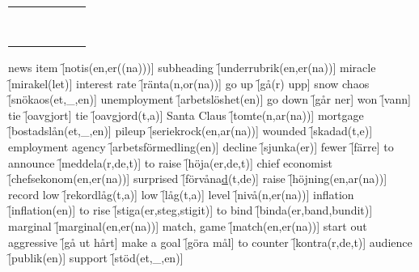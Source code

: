 \begin{center}
\begin{adjustwidth}{-2.45cm}{}
\begin{tabular}{|c c c c c c|}
             &  &  &  &  &  \\
             &  &  &  &  &  \\
             &  &  &  &  &  \\
             &  &  &  &  &  \\
             &  &  &  &  &  \\
             &  &  &  &  &  \\
             &  &  &  &  &  \\
             &  &  &  &  &  \\
            \hline
        \end{tabular}
    \end{adjustwidth}
\end{center}

\begin{questions}
    \begin{multicols}{2}
        \raggedcolumns
        \question news item \f[notis(en,er((na)))]
        \question subheading \f[underrubrik(en,er(na))]
        \question miracle \f[mirakel(let)]
        \question interest rate \f[ränta(n,or(na))]
        \question go up \f[gå(r) upp]
        \question snow chaos \f[snökaos(et,\_,en)]
        \question unemployment \f[arbetslöshet(en)]
        \question go down \f[går ner]
        \question won \f[vann]
        \question tie \f[oavgjort]
        \question tie \f[oavgjord(t,a)]
        \question Santa Claus \f[tomte(n,ar(na))]
        \question mortgage \f[bostadslån(et,\_,en)]
        \question pileup \f[seriekrock(en,ar(na))]
        \question wounded \f[skadad(t,e)]
        \question employment agency \f[arbetsförmedling(en)]
        \question decline \f[sjunka(er)]
        \question fewer \f[färre]
        \question to announce \f[meddela(r,de,t)]
        \question to raise \f[höja(er,de,t)]
        \question chief economist \f[chefsekonom(en,er(na))]
        \question surprised \f[förvåna\underline{d}(t,de)]
        \question raise \f[höjning(en,ar(na))]
        \question record low \f[rekordlåg(t,a)]
        \question low \f[låg(t,a)]
        \question level \f[nivå(n,er(na))]
        \question inflation \f[inflation(en)]
        \question to rise \f[stiga(er,steg,stigit)]
        \question to bind \f[binda(er,band,bundit)]
        \question marginal \f[marginal(en,er(na))]
        \question match, game \f[match(en,er(na))]
        \question start out aggressive \f[gå ut hårt]
        \question make a goal \f[göra mål]
        \question to counter \f[kontra(r,de,t)]
        \question audience \f[publik(en)]
        \question support \f[stöd(et,\_,en)]

\end{multicols}
\end{questions}
